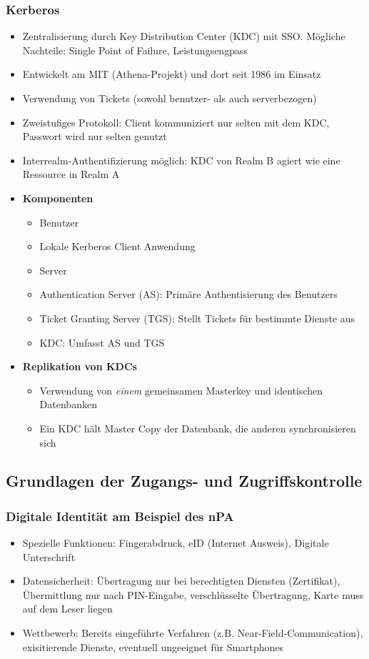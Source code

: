 \subsubsection{Kerberos}
\begin{itemize}
	\item Zentralisierung durch Key Distribution Center (KDC) mit SSO. Mögliche Nachteile: Single Point of Failure, Leistungsengpass
	\item Entwickelt am MIT (Athena-Projekt) und dort seit 1986 im Einsatz
	\item Verwendung von Tickets (sowohl benutzer- als auch serverbezogen)
	\item Zweistufiges Protokoll: Client kommuniziert nur selten mit dem KDC, Passwort wird nur selten genutzt
	\item Interrealm-Authentifizierung möglich: KDC von Realm B agiert wie eine Ressource in Realm A
	\item \textbf{Komponenten}
	\begin{itemize}
		\item Benutzer
		\item Lokale Kerberos Client Anwendung
		\item Server
		\item Authentication Server (AS): Primäre Authentisierung des Benutzers
		\item Ticket Granting Server (TGS): Stellt Tickets für bestimmte Dienste aus
		\item KDC: Umfasst AS und TGS
	\end{itemize}
	\item \textbf{Replikation von KDCs}
	\begin{itemize}
		\item Verwendung von \textit{einem} gemeinsamen Masterkey und identischen Datenbanken
		\item Ein KDC hält Master Copy der Datenbank, die anderen synchronisieren sich
	\end{itemize}
\end{itemize}


\subsection{Grundlagen der Zugangs- und Zugriffskontrolle}

\subsubsection{Digitale Identität am Beispiel des nPA}
\begin{itemize}
	\item Spezielle Funktionen: Fingerabdruck, eID (Internet Ausweis), Digitale Unterschrift
	\item Datensicherheit: Übertragung nur bei berechtigten Diensten (Zertifikat), Übermittlung nur nach PIN-Eingabe, verschlüsselte Übertragung, Karte muss auf dem Leser liegen
	\item Wettbewerb: Bereits eingeführte Verfahren (z.B. Near-Field-Communication), exisitierende Dienste, eventuell ungeeignet für Smartphones
\end{itemize}

